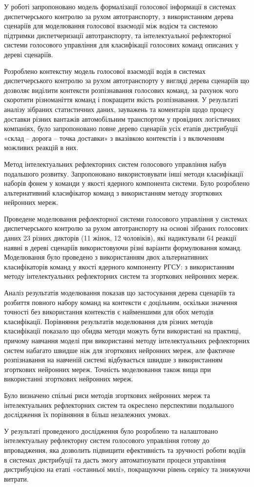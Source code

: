 У роботі запропоновано модель формалізації голосової інформації в системах диспетчерського контролю за рухом автотранспорту, з використанням дерева сценаріїв для моделювання голосової взаємодії між водієм та системою підтримки диспетчеризації автотранспорту, та інтелектуальної рефлекторної системи голосового управління для класифікації голосових команд описаних у дереві сценаріїв.

Розроблено контекстну модель голосової взаємодії водія в системах диспетчерського контролю за рухом автотранспорту у вигляді дерева сценаріїв що дозволяє виділити контексти розпізнавання голосових команд, за рахунок чого скоротити різноманіття команд і покращити якість розпізнавання. У результаті аналізу зібраних статистичних даних, зауважень та коментарів щодо процесу доставки різних вантажів автомобільним транспортом у провідних логістичних компаніях, було запропоновано повне дерево сценаріїв усіх етапів дистрибуції «склад – дорога – точка доставки» з вказівкою контекстів і з включенням можливих реакцій в них.

Метод інтелектуальних рефлекторних систем голосового управління набув подальшого розвитку. Запропоновано використовувати інші методи класифікації наборів фонем у команди у якості ядерного компонента системи. Було розроблено альтернативний класифікатор команд з використанням методу згорткових нейронних мереж.

Проведене моделювання рефлекторної системи голосового управління у системах диспетчерського контролю за рухом автотранспорту на основі зібраних голосових даних 23 різних дикторів (11 жінок, 12 чоловіків), які надиктували 64 реакції наявні в дереві сценаріїв використовуючи різні варіанти формулювання команд. Моделювання було проведено з використанням двох альтернативних класифікаторів команд у якості ядерного компоненту РГСУ: з використанням методу інтелектуальних рефлекторних систем та згорткових нейронних мереж.

Аналіз результатів моделювання показав що застосування дерева сценаріїв та розбиття повного набору команд на контексти є доцільним, оскільки значення точності без використання контекстів є найменшими для обох методів класифікації. Порівняння результатів моделювання для різних методів класифікації показало що обидва методи можуть бути використані на практиці, причому навчання моделі при використанні методу інтелектуальних рефлекторних систем набагато швидше ніж для згорткових нейронних мереж, але фактичне розпізнавання на навченій системі відбувається швидше з використанням згорткових нейронних мереж. Точність моделювання також вища при використанні згорткових нейронних мереж.

Було визначено спільні риси методів згорткових нейронних мереж та інтелектуальних рефлекторних систем та окреслено перспективи подальшого дослідження їх порівняння в більш незалежних умовах.

У результаті проведеного дослідження було розроблено та налаштовано інтелектуальну рефлекторну систем голосового управління готову до впровадження, яка дозволить підвищити ефективність та зручності роботи водіїв в системах дистрибуції та дасть змогу автоматизувати процеси управління дистрибуцією на етапі «останньої милі», покращуючи рівень сервісу та знижуючи витрати.
